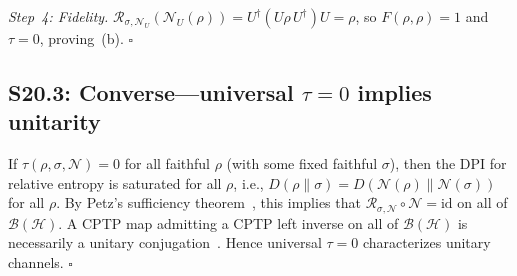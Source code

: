 \documentclass[prl,twocolumn,superscriptaddress,longbibliography]{revtex4-2}
\newcommand{\id}{\mathrm{id}}
\newcommand{\Petz}{\mathcal{R}}
\newcommand{\chan}{\mathcal{N}}
\newcommand{\hilb}{\mathcal{H}}
\newcommand{\tauasym}{\tau}
\begin{document}
\emph{Step~4: Fidelity.}
$\Petz_{\sigma,\chan_U}(\chan_U(\rho))
= U^\dagger(U\rho\, U^\dagger)U = \rho$,
so $F(\rho,\rho) = 1$ and $\tauasym = 0$, proving~(b).
\hfill$\square$

\subsection{S20.3: Converse---universal $\tauasym = 0$ implies unitarity}

If $\tauasym(\rho, \sigma, \chan) = 0$ for all faithful $\rho$
(with some fixed faithful $\sigma$), then the DPI for relative
entropy is saturated for all $\rho$, i.e.,
$D(\rho\|\sigma) = D(\chan(\rho)\|\chan(\sigma))$ for all $\rho$.
By Petz's sufficiency theorem~\cite{Petz1988}, this implies that
$\Petz_{\sigma,\chan} \circ \chan = \id$ on all of
$\mathcal{B}(\hilb)$.
A CPTP map admitting a CPTP left inverse on all of
$\mathcal{B}(\hilb)$ is necessarily a unitary
conjugation~\cite{Parzygnat2023}.
Hence universal $\tauasym = 0$ characterizes unitary channels.
\hfill$\square$

\end{document}
